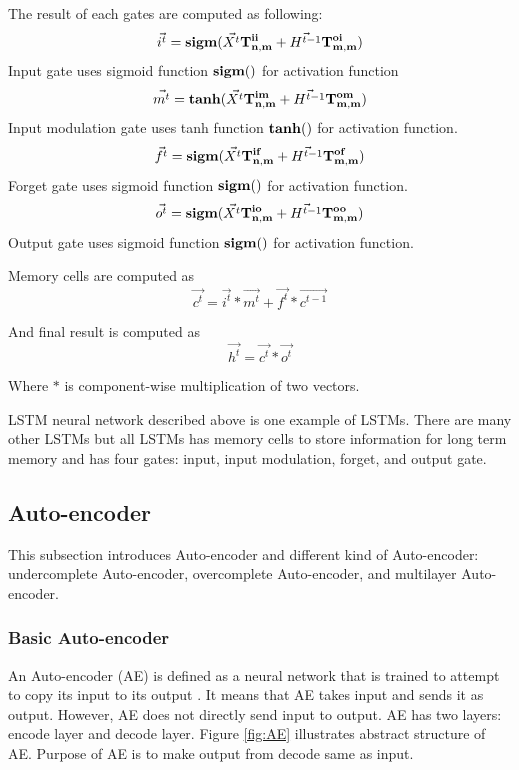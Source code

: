 \documentclass[draft,dvipsnames]{drexel-thesis}
\begin{document}
\begin{thesis}
\begin{enumerate}
	The result of each gates are computed as following:
	$$\vec{i^t} = \bold{sigm}(\vec{X^t}\bold{T_{n,m}^{ii}} + \vec{H^{t-1}}\bold{T_{m,m}^{oi}})$$
	Input gate uses sigmoid function $\bold{sigm()}$ for activation function
	$$\vec{m^t} = \bold{tanh}(\vec{X^t}\bold{T_{n,m}^{im}} + \vec{H^{t-1}}\bold{T_{m,m}^{om}})$$
	Input modulation gate uses tanh function $\bold{tanh()}$ for activation function.
	$$\vec{f^t} = \bold{sigm}(\vec{X^t}\bold{T_{n,m}^{if}} + \vec{H^{t-1}}\bold{T_{m,m}^{of}})$$
	Forget gate uses sigmoid function $\bold{sigm()}$ for activation function.
	$$\vec{o^t} = \bold{sigm}(\vec{X^t}\bold{T_{n,m}^{io}} + \vec{H^{t-1}}\bold{T_{m,m}^{oo}})$$
	Output gate uses sigmoid function $\bold{sigm()}$ for activation function.

	Memory cells are computed as
	$$\vec{c^t} = \vec{i^t} * \vec{m^t} + \vec{f^t} * \vec{c^{t-1}}$$

	And final result is computed as
	$$\vec{h^t} = \vec{c^t} * \vec{o^t}$$

	Where $*$ is component-wise multiplication of two vectors.
\end{enumerate}

	LSTM neural network described above is one example of LSTMs. There are many other LSTMs but all LSTMs has memory cells to store information for long term memory and has four gates: input, input modulation, forget, and output gate.



\subsection{Auto-encoder}\label{subsec:AE}

This subsection introduces Auto-encoder and different kind of Auto-encoder: undercomplete Auto-encoder, overcomplete Auto-encoder, and multilayer Auto-encoder.


\subsubsection{Basic Auto-encoder}\label{subsubsec:BAE}
An Auto-encoder (AE) is defined as a neural network that is trained to attempt to copy its input to its output \cite{Goodfellow-et-al-2016}. It means that AE takes input and sends it as output. However, AE does not directly send input to output. AE has two layers: encode layer and decode layer. Figure \ref{fig:AE} illustrates abstract structure of AE. Purpose of AE is to make output from decode same as input.


\end{thesis}
\end{document}
